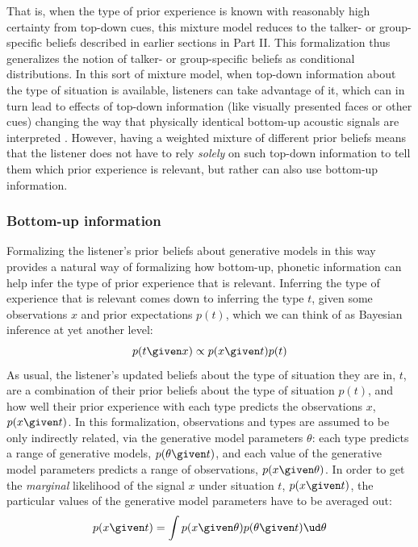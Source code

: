 That is, when the type of prior experience is known with reasonably high certainty from top-down cues, this mixture model reduces to the talker- or group-specific beliefs described in earlier sections in Part II.  This formalization thus generalizes the notion of talker- or group-specific beliefs as conditional distributions.  In this sort of mixture model, when top-down information about the type of situation is available, listeners can take advantage of it, which can in turn lead to effects of top-down information (like visually presented faces or other cues) changing the way that physically identical bottom-up acoustic signals are interpreted \autocite{Johnson1999,Hay2010,StaumCasasanto2008,Strand1996}.  However, having a weighted mixture of different prior beliefs means that the listener does not have to rely \emph{solely} on such top-down information to tell them which prior experience is relevant, but rather can also use bottom-up information.

\subsubsection{Bottom-up information}
\label{sec:bott-up-inform}

Formalizing the listener's prior beliefs about generative models in this way provides a natural way of formalizing how bottom-up, phonetic information can help infer the type of prior experience that is relevant.  Inferring the type of experience that is relevant comes down to inferring the type $t$, given some observations $x$ and prior expectations $p(t)$, which we can think of as Bayesian inference at yet another level: 
\begin{equation}
  \label{eq:33}
  p(t \given x) \propto p(x \given t) p(t)
\end{equation}
As usual, the listener's updated beliefs about the type of situation they are in, $t$, are a combination of their prior beliefs about the type of situation $p(t)$, and how well their prior experience with each type predicts the observations $x$, $p(x\given t)$.  In this formalization, observations and types are assumed to be only indirectly related, via the generative model parameters $\theta$: each type predicts a range of generative models, $p(\theta \given t)$, and each value of the generative model parameters predicts a range of observations, $p(x \given \theta)$.  In order to get the \emph{marginal} likelihood of the signal $x$ under situation $t$, $p(x\given t)$, the particular values of the generative model parameters have to be averaged out:
\begin{equation}
  \label{eq:34}
  p(x \given t) = \int p(x \given \theta) p(\theta \given t) \ud \theta
\end{equation}

